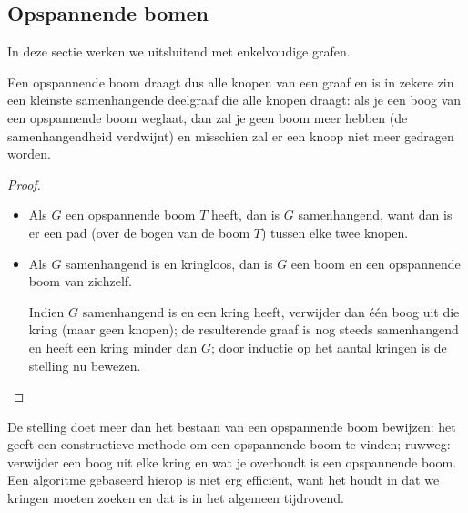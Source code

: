 \subsection{Opspannende bomen}

In deze sectie werken we uitsluitend met enkelvoudige grafen.


Een opspannende boom draagt dus alle knopen van een graaf en is in
zekere zin een kleinste 
samenhangende
deelgraaf die alle knopen draagt: als je een
boog van een opspannende boom weglaat, dan zal je geen boom meer
hebben (de samenhangendheid verdwijnt) en misschien zal er een knoop niet meer
gedragen worden.

\begin{proof}
\begin{itemize}
\item
Als $G$ een opspannende boom $T$ heeft, dan is $G$ samenhangend, want dan is
er een pad (over de bogen van de boom $T$) tussen elke twee knopen.

\item
Als $G$ samenhangend is en kringloos, dan is $G$ een boom en een
opspannende boom van zichzelf.

Indien $G$ samenhangend is en een kring heeft, verwijder dan \'{e}\'{e}n
boog uit die kring (maar geen knopen); de resulterende graaf is nog
steeds samenhangend en heeft een kring minder dan $G$; door inductie op
het aantal kringen is de stelling nu bewezen.
\end{itemize}
\end{proof}

De stelling doet meer dan het bestaan van een opspannende boom
bewijzen: het geeft een constructieve methode om een opspannende boom
te vinden; ruwweg: verwijder een boog uit elke kring en wat je
overhoudt is een opspannende boom. Een algoritme gebaseerd hierop is
niet erg effici\"ent, want het houdt in dat we kringen moeten zoeken en
dat is in het algemeen tijdrovend.

